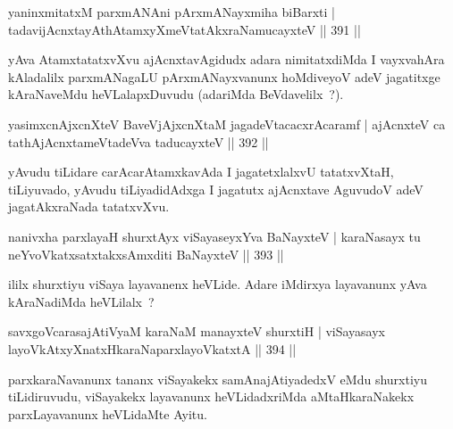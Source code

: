 
\begin{shl}
yaninxmitatxM parxmANAni pArxmANayxmiha biBarxti |
tadavijAcnxtayAthAtamxyXmeVtatAkxraNamucayxteV \hfill || 391 ||
\end{shl}

\begin{artha}
yAva AtamxtatatxvXvu ajAcnxtavAgidudx adara nimitatxdiMda I vayxvahAra kAladalilx parxmANagaLU pArxmANayxvanunx hoMdiveyoV adeV jagatitxge kAraNaveMdu heVLalapxDuvudu (adariMda BeVdavelilx~?).
\end{artha}


\begin{shl}
yasimxcnAjxcnXteV BaveVjAjxcnXtaM jagadeVtacacxrAcaramf |
ajAcnxteV ca tathA\s jAcnxtameVtadeVva taducayxteV \hfill || 392 ||
\end{shl}

\begin{artha}
yAvudu tiLidare carAcarAtamxkavAda I jagatetxlalxvU tatatxvXtaH, tiLiyuvado, yAvudu tiLiyadidAdxga I jagatutx ajAcnxtave AguvudoV adeV jagatAkxraNada tatatxvXvu.
\end{artha}


\begin{shl}
nanivxha parxlayaH shurxtAyx viSayaseyxYva BaNayxteV |
karaNasayx tu neYvoVkatxsatxtakxsAmxditi BaNayxteV \hfill || 393 ||
\end{shl}

\begin{artha}
ililx shurxtiyu viSaya layavanenx heVLide. Adare iMdirxya layavanunx yAva kAraNadiMda heVLilalx~?
\end{artha}


\begin{shl}
savxgoVcarasajAtiVyaM karaNaM manayxteV shurxtiH |
viSayasayx layoVkAtxyX\s natxHkaraNaparxlayoVkatxtA \hfill || 394 ||
\end{shl}

\begin{artha}
parxkaraNavanunx tananx viSayakekx samAnajAtiyadedxV eMdu shurxtiyu tiLidiruvudu, viSayakekx layavanunx heVLidadxriMda aMtaHkaraNakekx parxLayavanunx heVLidaMte Ayitu.
\end{artha}

